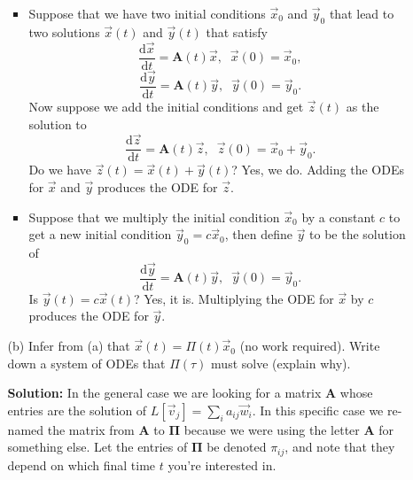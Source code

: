 \documentclass[11pt,fleqn]{article}
\begin{document}
\begin{enumerate}
\begin{itemize}
		\begin{itemize}
		\item Suppose that we have two initial conditions $\vec{x}_0$ and $\vec{y}_0$ that lead to two solutions $\vec{x}(t)$ and $\vec{y}(t)$ that satisfy
	\[\frac{\mathrm{d}\vec{x}}{\mathrm{d}t} = \mathbf{A}(t)\vec{x},\;\;\vec{x}(0) = \vec{x}_0,\]
	\[\frac{\mathrm{d}\vec{y}}{\mathrm{d}t} = \mathbf{A}(t)\vec{y},\;\;\vec{y}(0) = \vec{y}_0.\]
	Now suppose we add the initial conditions and get $\vec{z}(t)$ as the solution to 
	\[\frac{\mathrm{d}\vec{z}}{\mathrm{d}t} = \mathbf{A}(t)\vec{z},\;\;\vec{z}(0) = \vec{x}_0 + \vec{y}_0.\] 
	Do we have $\vec{z}(t) = \vec{x}(t) + \vec{y}(t)$? Yes, we do. Adding the ODEs for $\vec{x}$ and $\vec{y}$ produces the ODE for $\vec{z}$.
		\item Suppose that we multiply the initial condition $\vec{x}_0$ by a constant $c$ to get a new initial condition $\vec{y}_0=c\vec{x}_0$, then define $\vec{y}$ to be the solution of
	\[\frac{\mathrm{d}\vec{y}}{\mathrm{d}t} = \mathbf{A}(t)\vec{y},\;\;\vec{y}(0) = \vec{y}_0.\]
	Is $\vec{y}(t) = c\vec{x}(t)$? Yes, it is. Multiplying the ODE for $\vec{x}$ by $c$ produces the ODE for $\vec{y}$.
	\end{itemize}
	\item[(b)] Infer from (a) that $\vec{x}(t) = \Pi(t)\vec{x}_0$ (no work required). Write down a system of ODEs that $\Pi(\tau)$ must solve (explain why). 
	
	{\bf Solution:} In the general case we are looking for a matrix $\mathbf{A}$ whose entries are the solution of $L[\vec{v}_j] = \sum_i a_{ij}\vec{w}_i$. In this specific case we re-named the matrix from $\mathbf{A}$ to $\mathbf{\Pi}$ because we were using the letter {\bf A} for something else. Let the entries of $\mathbf{\Pi}$ be denoted $\pi_{ij}$, and note that they depend on which final time $t$ you're interested in.
	

\end{itemize}
\end{enumerate}
\end{document}
